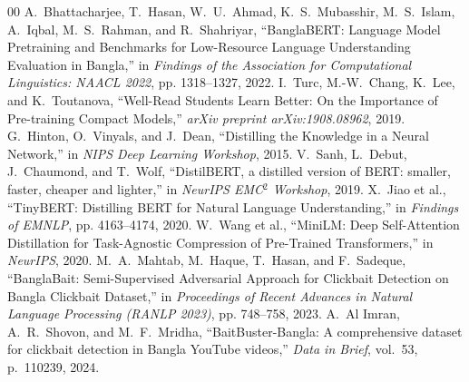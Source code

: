 \documentclass[conference]{IEEEtran}
\begin{document}
\begin{thebibliography}{00}
 A.~Bhattacharjee, T.~Hasan, W.~U.~Ahmad, K.~S.~Mubasshir, M.~S.~Islam, A.~Iqbal, M.~S.~Rahman, and R.~Shahriyar, ``BanglaBERT: Language Model Pretraining and Benchmarks for Low-Resource Language Understanding Evaluation in Bangla,'' in \textit{Findings of the Association for Computational Linguistics: NAACL 2022}, pp. 1318--1327, 2022.
 I.~Turc, M.-W.~Chang, K.~Lee, and K.~Toutanova, ``Well-Read Students Learn Better: On the Importance of Pre-training Compact Models,'' \textit{arXiv preprint arXiv:1908.08962}, 2019.
 G.~Hinton, O.~Vinyals, and J.~Dean, ``Distilling the Knowledge in a Neural Network,'' in \textit{NIPS Deep Learning Workshop}, 2015.
 V.~Sanh, L.~Debut, J.~Chaumond, and T.~Wolf, ``DistilBERT, a distilled version of BERT: smaller, faster, cheaper and lighter,'' in \textit{NeurIPS EMC$^2$ Workshop}, 2019.
 X.~Jiao et al., ``TinyBERT: Distilling BERT for Natural Language Understanding,'' in \textit{Findings of EMNLP}, pp. 4163--4174, 2020.
 W.~Wang et al., ``MiniLM: Deep Self-Attention Distillation for Task-Agnostic Compression of Pre-Trained Transformers,'' in \textit{NeurIPS}, 2020.
 M.~A.~Mahtab, M.~Haque, T.~Hasan, and F.~Sadeque, ``BanglaBait: Semi-Supervised Adversarial Approach for Clickbait Detection on Bangla Clickbait Dataset,'' in \textit{Proceedings of Recent Advances in Natural Language Processing (RANLP 2023)}, pp. 748--758, 2023.
 A.~Al Imran, A.~R.~Shovon, and M.~F.~Mridha, ``BaitBuster-Bangla: A comprehensive dataset for clickbait detection in Bangla YouTube videos,'' \textit{Data in Brief}, vol.~53, p.~110239, 2024.
\end{thebibliography}
\end{document}
